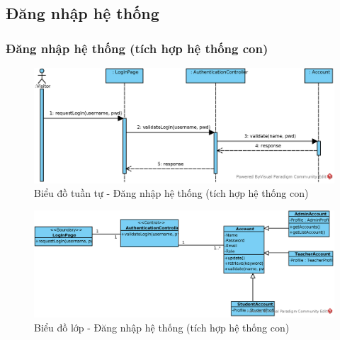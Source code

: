 \documentclass[./../main.tex]{subfiles}
\begin{document}
\subsection{Đăng nhập hệ thống}
\subsubsection{Đăng nhập hệ thống (tích hợp hệ thống con)}
\begin{figure}[H]
    \centering
    \includegraphics[width=\linewidth]{./images/UseCaseDesignDiagram/ucr_ss_login.eps}
    \caption{Biểu đồ tuần tự - Đăng nhập hệ thống (tích hợp hệ thống con)}
\end{figure}
\begin{figure}[H]
    \centering
    \includegraphics[width=\linewidth]{./images/UseCaseDesignDiagram/ucd_ss_login.eps}
    \caption{Biểu đồ lớp - Đăng nhập hệ thống (tích hợp hệ thống con)}
\end{figure}
\end{document}
